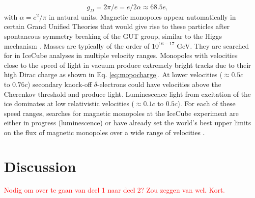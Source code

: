 \begin{equation}
\label{eq:mopocharge}
g_D = 2\pi/e = e/2\alpha \approx 68.5e,
\end{equation}
with $\alpha = e^2/\pi$ in natural units. Magnetic monopoles appear automatically in certain Grand Unified Theories that would give rise to these particles after spontaneous symmetry breaking of the GUT group, similar to the Higgs mechanism \cite{HOOFT1974276,Polyakov:1974ek}. Masses are typically of the order of $10^{16-17}$ GeV. They are searched for in IceCube analyses in multiple velocity ranges. Monopoles with velocities close to the speed of light in vacuum produce extremely bright tracks due to their high Dirac charge as shown in Eq. \ref{eq:mopocharge}. At lower velocities ($\approx 0.5c$ to $0.76c$) secondary knock-off $\delta$-electrons could have velocities above the Cherenkov threshold and produce light. Luminescence light from excitation of the ice dominates at low relativistic velocities ($\approx 0.1c$ to $0.5c$). For each of these speed ranges, searches for magnetic monopoles at the IceCube experiment are either in progress (luminescence) or have already set the world's best upper limits on the flux of magnetic monopoles over a wide range of velocities \cite{Aartsen:2014awd}.


\section{Discussion}
\textcolor{red}{Nodig om over te gaan van deel 1 naar deel 2? Zou zeggen van wel. Kort.}
















